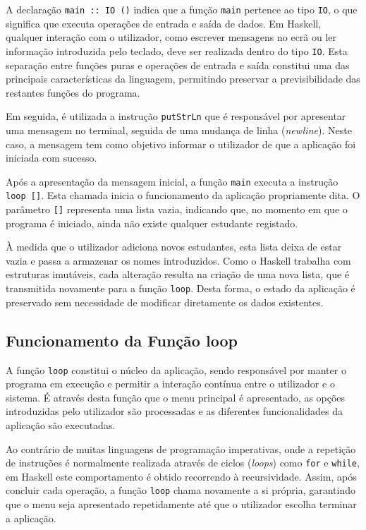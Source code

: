 \documentclass[12pt,a4paper]{article}
\begin{document}
A declaração \texttt{main :: IO ()} indica que a função \texttt{main} pertence ao tipo \texttt{IO}, o que significa que executa operações de entrada e saída de dados. Em Haskell, qualquer interação com o utilizador, como escrever mensagens no ecrã ou ler informação introduzida pelo teclado, deve ser realizada dentro do tipo \texttt{IO}. Esta separação entre funções puras e operações de entrada e saída constitui uma das principais características da linguagem, permitindo preservar a previsibilidade das restantes funções do programa.

Em seguida, é utilizada a instrução \texttt{putStrLn} que é responsável por apresentar uma mensagem no terminal, seguida de uma mudança de linha (\textit{newline}). Neste caso, a mensagem tem como objetivo informar o utilizador de que a aplicação foi iniciada com sucesso.

Após a apresentação da mensagem inicial, a função \texttt{main} executa a instrução \texttt{loop []}. Esta chamada inicia o funcionamento da aplicação propriamente dita. O parâmetro \texttt{[]} representa uma lista vazia, indicando que, no momento em que o programa é iniciado, ainda não existe qualquer estudante registado.

À medida que o utilizador adiciona novos estudantes, esta lista deixa de estar vazia e passa a armazenar os nomes introduzidos. Como o Haskell trabalha com estruturas imutáveis, cada alteração resulta na criação de uma nova lista, que é transmitida novamente para a função \texttt{loop}. Desta forma, o estado da aplicação é preservado sem necessidade de modificar diretamente os dados existentes.

\subsection{Funcionamento da Função loop}
A função \texttt{loop} constitui o núcleo da aplicação, sendo responsável por manter o programa em execução e permitir a interação contínua entre o utilizador e o sistema. É através desta função que o menu principal é apresentado, as opções introduzidas pelo utilizador são processadas e as diferentes funcionalidades da aplicação são executadas.

Ao contrário de muitas linguagens de programação imperativas, onde a repetição de instruções é normalmente realizada através de ciclos (\textit{loops}) como \texttt{for} e \texttt{while}, em Haskell este comportamento é obtido recorrendo à recursividade. Assim, após concluir cada operação, a função \texttt{loop} chama novamente a si própria, garantindo que o menu seja apresentado repetidamente até que o utilizador escolha terminar a aplicação.
\end{document}
